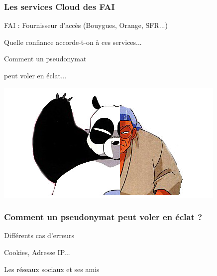\documentclass{beamer}
\begin{document}
\begin{frame}
\frametitle{Les services Cloud des FAI}
\begin{block}{FAI : Fournisseur d'accès (Bouygues, Orange, SFR...)}
\begin{itemize}
\end{itemize}
\end{block}
Quelle confiance accorde-t-on à ces services...
\end{frame}
\begin{frame}
\Huge{\centerline{Comment un pseudonymat}}
\Huge{\centerline{peut voler en éclat...}}
\begin{center}
\includegraphics[scale=0.5]{./images/pseudonymat.jpg}
\end{center}
\end{frame}
\begin{frame}
\frametitle{Comment un pseudonymat peut voler en éclat ?}
\begin{block}{Différents cas d'erreurs}
\begin{itemize}
\end{itemize}
\end{block}
\begin{block}{Cookies, Adresse IP...}
\begin{itemize}
\end{itemize}
\end{block}
\begin{block}{Les réseaux sociaux et ses amis}
\begin{itemize}
\end{itemize}
\end{block}
\end{frame}
\end{document}
